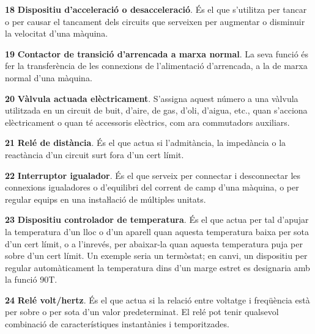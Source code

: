 \begin{multicols}{2}
\begin{list}{}
\item[\textbf{18}]  
 \textbf{Dispositiu d'acceleració o desacceleració}. És
el que s'utilitza per tancar o per causar el tancament dels circuits
que serveixen per augmentar o disminuir la velocitat d'una màquina.

\item[\textbf{19}]  
\textbf{Contactor de transició d'arrencada a marxa normal}. La seva
funció és fer la transferència de les connexions de l'alimentació
d'arrencada, a la de marxa normal d'una màquina.

\item[\textbf{20}]  
 \textbf{Vàlvula actuada elèctricament}. S'assigna aquest número a una vàlvula
utilitzada en un circuit de buit, d'aire, de gas, d'oli, d'aigua,
etc., quan s'acciona elèctricament o quan té accessoris elèctrics,
com ara commutadors auxiliars.

\item[\textbf{21}]   
\textbf{Relé de distància}. És el que actua
si l'admitància, la impedància o la reactància d'un circuit surt fora d'un cert límit.

\item[\textbf{22}]   
\textbf{Interruptor igualador}.  És el
que serveix per connectar i desconnectar les connexions igualadores
o d'equilibri del corrent de camp d'una màquina, o per regular
equips en una  instaŀlació de  múltiples unitats.

\item[\textbf{23}]   
\textbf{Dispositiu controlador de temperatura}. És el que actua per tal d'apujar la
temperatura d'un lloc o d'un aparell quan aquesta temperatura baixa
per sota d'un cert límit, o a l'inrevés, per abaixar-la quan aquesta
temperatura  puja per sobre d'un cert límit. Un exemple seria un
termòstat; en canvi, un dispositiu per regular automàticament la temperatura dins
d'un marge estret es designaria amb la funció 90T.

\item[\textbf{24}]  
 \textbf{Relé volt/hertz}.
És el que actua si la relació  entre voltatge i freqüència està per sobre o  per sota d'un valor predeterminat. El relé pot tenir qualsevol combinació de característiques instantànies i temporitzades.


\end{list}
\end{multicols}
